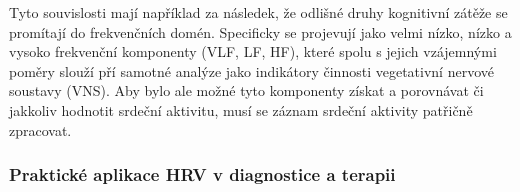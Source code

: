 Tyto souvislosti mají například za následek, že odlišné druhy kognitivní zátěže
se promítají do frekvenčních domén. Specificky se projevují jako velmi nízko,
nízko a vysoko frekvenční komponenty (VLF, LF, HF), které spolu s jejich
vzájemnými poměry slouží pří samotné analýze jako indikátory činnosti
vegetativní nervové soustavy (VNS). Aby bylo ale možné tyto komponenty získat a
porovnávat či jakkoliv hodnotit srdeční aktivitu, musí se záznam srdeční
aktivity patřičně zpracovat.

\subsubsection{Praktické aplikace HRV v diagnostice a terapii}
